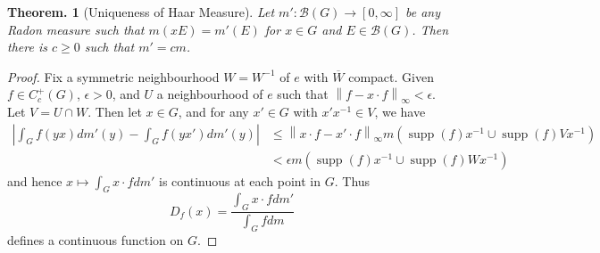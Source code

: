 \documentclass[11pt, a4paper]{memoir}
\newcommand{\norm}[1]{\ensuremath{\left\lVert#1\right\rVert}}
\theoremstyle{change}
\newtheorem{theorem}{Theorem.}[section]
\theoremstyle{plain}
\theoremstyle{nonumberplain}
\newtheorem{proof}{Proof}
\DeclareMathOperator{\supp}{supp}
\numberwithin{equation}{section}
\begin{document}
\begin{theorem}[Uniqueness of Haar Measure]
    Let $m':\mathcal{B}(G)\to[0,\infty]$ be any Radon measure such that $m(xE)=m'(E)$ for $x\in G$ and $E\in\mathcal{B}(G)$.
    Then there is $c\geq 0$ such that $m'=cm$.
\end{theorem}
\begin{proof}
    Fix a symmetric neighbourhood $W=W^{-1}$ of $e$ with $\overline{W}$ compact.
    Given $f\in C_c^+(G)$, $\epsilon>0$, and $U$ a neighbourhood of $e$ such that $\norm{f-x\cdot f}_\infty<\epsilon$.
    Let $V=U\cap W$.
    Then let $x\in G$, and for any $x'\in G$ with $x'x^{-1}\in V$, we have
    \begin{align*}
        \left\lvert\int_G f(yx)dm'(y)-\int_G f(yx')dm'(y)\right\rvert&\leq\norm{x\cdot f-x'\cdot f}_\infty m(\supp(f)x^{-1}\cup\supp(f)Vx^{-1})\\
                                                                     &<\epsilon m(\supp(f)x^{-1}\cup\supp(f)Wx^{-1})
    \end{align*}
    and hence $x\mapsto\int_G x\cdot fdm'$ is continuous at each point in $G$.
    Thus
    \begin{equation*}
        D_f(x) = \frac{\int_Gx\cdot fdm'}{\int_G fdm}
    \end{equation*}
    defines a continuous function on $G$.


\end{proof}
\end{document}
